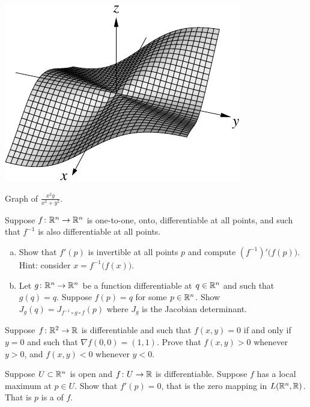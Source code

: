 \begin{myfigureht}
\includegraphics{figures/xsqyxsqysq}
\caption{Graph of $\frac{x^2y}{x^2+y^2}$.\label{fig:xsqyxsqysq}}
\end{myfigureht}

\begin{samepage}
\begin{exercise}
Suppose $f \colon {\mathbb{R}}^n \to {\mathbb{R}}^n$ is one-to-one, onto, differentiable at all
points, and such that $f^{-1}$ is also differentiable at all points.
\begin{enumerate}[a)]
\item
Show that $f'(p)$ is invertible at all points $p$ and compute
${(f^{-1})}'\bigl(f(p)\bigr)$.  Hint: consider $x = f^{-1}\bigl(f(x)\bigr)$.
\item
Let $g \colon {\mathbb{R}}^n \to {\mathbb{R}}^n$ be a function differentiable at $q \in {\mathbb{R}}^n$
and such that $g(q)=q$.  Suppose $f(p) = q$ for some $p \in {\mathbb{R}}^n$.
Show $J_g(q) = J_{f^{-1} \circ g \circ f}(p)$ where $J_g$ is the Jacobian
determinant.
\end{enumerate}
\end{exercise}
\end{samepage}

\begin{exercise}
Suppose $f \colon {\mathbb{R}}^2 \to {\mathbb{R}}$ is differentiable and such that
$f(x,y) = 0$ if and only if $y=0$ and such that $\nabla f(0,0) = (1,1)$.
Prove that $f(x,y) > 0$ whenever $y > 0$, and
$f(x,y) < 0$ whenever $y < 0$.
\end{exercise}

\begin{exercise} \label{exercise:mv:maximumcritical}
Suppose $U \subset {\mathbb{R}}^n$ is open and
$f \colon U \to {\mathbb{R}}$ is differentiable.  Suppose $f$ has a local maximum
at $p \in U$.  Show that $f'(p) = 0$, that is the zero mapping in
$L({\mathbb{R}}^n,{\mathbb{R}})$.  That is $p$ is a
\emph{} of $f$.
\end{exercise}

